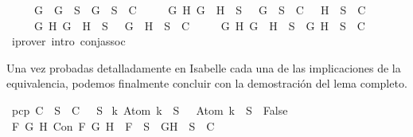 \begin{isabellebody}
\ \ \ \ {\isasymand}\ {\isacharparenleft}{\isasymforall}G{\isachardot}\ \isactrlbold {\isasymnot}\ {\isacharparenleft}\isactrlbold {\isasymnot}G{\isacharparenright}\ {\isasymin}\ S\ {\isasymlongrightarrow}\ {\isacharbraceleft}G{\isacharbraceright}\ {\isasymunion}\ S\ {\isasymin}\ C{\isacharparenright}\isanewline
\ \ \ \ {\isasymand}\ {\isacharparenleft}{\isasymforall}G\ H{\isachardot}\ \isactrlbold {\isasymnot}{\isacharparenleft}G\ \isactrlbold {\isasymand}\ H{\isacharparenright}\ {\isasymin}\ S\ {\isasymlongrightarrow}\ {\isacharbraceleft}\isactrlbold {\isasymnot}\ G{\isacharbraceright}\ {\isasymunion}\ S\ {\isasymin}\ C\ {\isasymor}\ {\isacharbraceleft}\isactrlbold {\isasymnot}\ H{\isacharbraceright}\ {\isasymunion}\ S\ {\isasymin}\ C{\isacharparenright}\isanewline
\ \ \ \ {\isasymand}\ {\isacharparenleft}{\isasymforall}G\ H{\isachardot}\ \isactrlbold {\isasymnot}{\isacharparenleft}G\ \isactrlbold {\isasymor}\ H{\isacharparenright}\ {\isasymin}\ S\ {\isasymlongrightarrow}\ {\isacharbraceleft}\isactrlbold {\isasymnot}\ G{\isacharcomma}\ \isactrlbold {\isasymnot}\ H{\isacharbraceright}\ {\isasymunion}\ S\ {\isasymin}\ C{\isacharparenright}\isanewline
\ \ \ \ {\isasymand}\ {\isacharparenleft}{\isasymforall}G\ H{\isachardot}\ \isactrlbold {\isasymnot}{\isacharparenleft}G\ \isactrlbold {\isasymrightarrow}\ H{\isacharparenright}\ {\isasymin}\ S\ {\isasymlongrightarrow}\ {\isacharbraceleft}G{\isacharcomma}\isactrlbold {\isasymnot}\ H{\isacharbraceright}\ {\isasymunion}\ S\ {\isasymin}\ C{\isacharparenright}{\isachardoublequoteclose}\isanewline
\ \ \ \ \isamarkupfalse%
\ {\isacharparenleft}iprover\ intro{\isacharcolon}\ conj{\isacharunderscore}assoc{\isacharparenright}\isanewline
{}\isamarkupfalse%
%
\endisatagproof
{\isafoldproof}%
%
\isadelimproof
%
\endisadelimproof
%
\begin{isamarkuptext}%
Una vez probadas detalladamente en Isabelle cada una de las implicaciones de la
  equivalencia, podemos finalmente concluir con la demostración del lema completo.%
\end{isamarkuptext}\isamarkuptrue%
\isamarkupfalse%
\ {\isachardoublequoteopen}pcp\ C\ {\isacharequal}\ {\isacharparenleft}{\isasymforall}S\ {\isasymin}\ C{\isachardot}\ {\isasymbottom}\ {\isasymnotin}\ S\isanewline
{\isasymand}\ {\isacharparenleft}{\isasymforall}k{\isachardot}\ Atom\ k\ {\isasymin}\ S\ {\isasymlongrightarrow}\ \isactrlbold {\isasymnot}\ {\isacharparenleft}Atom\ k{\isacharparenright}\ {\isasymin}\ S\ {\isasymlongrightarrow}\ False{\isacharparenright}\isanewline
{\isasymand}\ {\isacharparenleft}{\isasymforall}F\ G\ H{\isachardot}\ Con\ F\ G\ H\ {\isasymlongrightarrow}\ F\ {\isasymin}\ S\ {\isasymlongrightarrow}\ {\isacharbraceleft}G{\isacharcomma}H{\isacharbraceright}\ {\isasymunion}\ S\ {\isasymin}\ C{\isacharparenright}\isanewline

\end{isabellebody}
